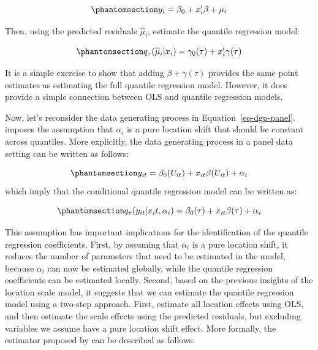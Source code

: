 \documentclass[bib]{statapress}
\begin{document}
\begin{equation}\phantomsection\label{eq-ls-1}{y_i = \beta_0+x_i'\beta + \mu_i
}\end{equation}

Then, using the predicted residuals \(\hat \mu_i\), estimate the
quantile regression model:

\begin{equation}\phantomsection\label{eq-ls-2}{q_\tau(\hat \mu_i|x_i)=\gamma_0(\tau)+ x_i'\gamma(\tau)
}\end{equation}

It is a simple exercise to show that adding \(\beta+\gamma(\tau)\)
provides the same point estimates as estimating the full quantile
regression model. However, it does provide a simple connection between
OLS and quantile regression models.

Now, let's reconsider the data generating process in
Equation~\ref{eq-dgp-panel}. \citet{canay2011} imposes the assumption
that \(\alpha_i\) is a pure location shift that should be constant
across quantiles. More explicitly, the data generating process in a
panel data setting can be written as follows:

\begin{equation}\phantomsection\label{eq-canay-dgp}{y_{it} = \beta_0(U_{it}) + x_{it}\beta(U_{it}) + \alpha_i
}\end{equation} which imply that the conditional quantile regression
model can be written as:

\begin{equation}\phantomsection\label{eq-canay-qreg}{q_\tau(y_{it}|x_it,\alpha_i) = \beta_0(\tau) + x_{it}\beta(\tau) + \alpha_i
}\end{equation}

This assumption has important implications for the identification of the
quantile regression coefficients. First, by assuming that \(\alpha_i\)
is a pure location shift, it reduces the number of parameters that need
to be estimated in the model, because \(\alpha_i\) can now be estimated
globally, while the quantile regression coefficients can be estimated
locally. Second, based on the previous insights of the location scale
model, it suggests that we can estimate the quantile regression model
using a two-step approach. First, estimate all location effects using
OLS, and then estimate the scale effects using the predicted residuals,
but excluding variables we assume have a pure location shift effect.
More formally, the estimator proposed by \citet{canay2011} can be
described as follows:
\end{document}
